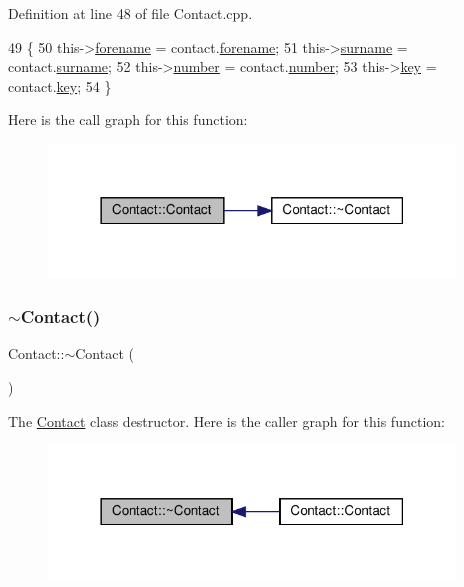 Definition at line 48 of file Contact.\+cpp.


\begin{DoxyCode}
49 \{
50     this->\hyperlink{class_contact_af64e25f3271abad7970293e6adfdf457}{forename} = contact.\hyperlink{class_contact_af64e25f3271abad7970293e6adfdf457}{forename};
51     this->\hyperlink{class_contact_a22518b332de3bd09ed94eb4d9de54894}{surname} = contact.\hyperlink{class_contact_a22518b332de3bd09ed94eb4d9de54894}{surname};
52     this->\hyperlink{class_contact_abd24eed27b661da4ab20553443212437}{number} = contact.\hyperlink{class_contact_abd24eed27b661da4ab20553443212437}{number};
53     this->\hyperlink{class_contact_a5bc7925e6356e29c9cbad7266f0a4340}{key} = contact.\hyperlink{class_contact_a5bc7925e6356e29c9cbad7266f0a4340}{key};
54 \}
\end{DoxyCode}
Here is the call graph for this function\+:
\nopagebreak
\begin{figure}[H]
\begin{center}
\leavevmode
\includegraphics[width=306pt]{dd/d2a/class_contact_a9657abb8a68839149c8d928b4c16a82c_cgraph}
\end{center}
\end{figure}
\mbox{\label{class_contact_ab68013cc59e3d640735c573e52c35219}} 
\subsubsection{\texorpdfstring{$\sim$\+Contact()}{~Contact()}}
{\footnotesize\ttfamily Contact\+::$\sim$\+Contact (\begin{DoxyParamCaption}{ }\end{DoxyParamCaption})\hspace{0.3cm}{\ttfamily [default]}}

The \hyperlink{class_contact}{Contact} class destructor. Here is the caller graph for this function\+:
\nopagebreak
\begin{figure}[H]
\begin{center}
\leavevmode
\includegraphics[width=306pt]{dd/d2a/class_contact_ab68013cc59e3d640735c573e52c35219_icgraph}
\end{center}
\end{figure}


